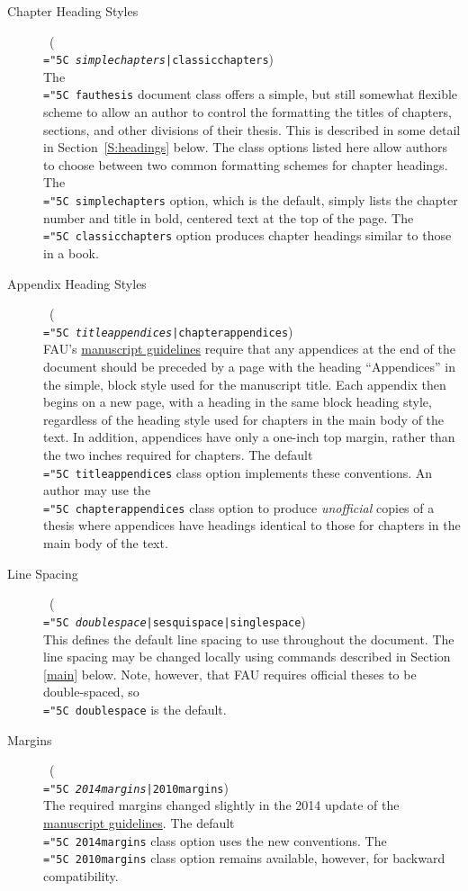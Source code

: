 \documentclass[11pt]{article}
\newcommand\guide{{http://www.fau.edu/graduate/forms-and-procedures/degree-completion/thesis-and-dissertation/index.php}}
\newcommand\code[1]{{\normalfont\texttt{\let\dv\textsl\chardef\\="5C #1}}}
\begin{document}
\begin{description}
\item[Chapter Heading Styles] \dotfill\ (\code{\dv{simplechapters}|classicchapters})\\
The \code{fauthesis} document class offers a simple, but still somewhat flexible scheme to allow an author to control the formatting the titles of chapters, sections, and other divisions of their thesis.  This is described in some detail in Section~\ref{S:headings} below.  The class options listed here allow authors to choose between two common formatting schemes for chapter headings.  The \code{simplechapters} option, which is the default, simply lists the chapter number and title in bold, centered text at the top of the page.  The \code{classicchapters} option produces chapter headings similar to those in a book.

\item[Appendix Heading Styles] \dotfill\ (\code{\dv{titleappendices}|chapterappendices})\\
FAU's \href{\guide}{manuscript guidelines} require that any appendices at the end of the document should be preceded by a page with the heading ``Appendices'' in the simple, block style used for the manuscript title.  Each appendix then begins on a new page, with a heading in the same block heading style, regardless of the heading style used for chapters in the main body of the text.  In addition, appendices have only a one-inch top margin, rather than the two inches required for chapters.  The default \code{titleappendices} class option implements these conventions.  An author may use the \code{chapterappendices} class option to produce \textit{unofficial} copies of a thesis where appendices have headings identical to those for chapters in the main body of the text.

\item[Line Spacing] \dotfill\ (\code{\dv{doublespace}|sesquispace|singlespace})\\
This defines the default line spacing to use throughout the document.  The line spacing may be changed locally using commands described in Section \ref{main} below.  Note, however, that FAU requires official theses to be double-spaced, so \code{doublespace} is the default.

\item[Margins] \dotfill\ (\code{\dv{2014margins}|2010margins})\\
The required margins changed slightly in the 2014 update of the \href{\guide}{manuscript guidelines}.  The default \code{2014margins} class option uses the new conventions.  The \code{2010margins} class option remains available, however, for backward compatibility.


\end{description}
\end{document}
